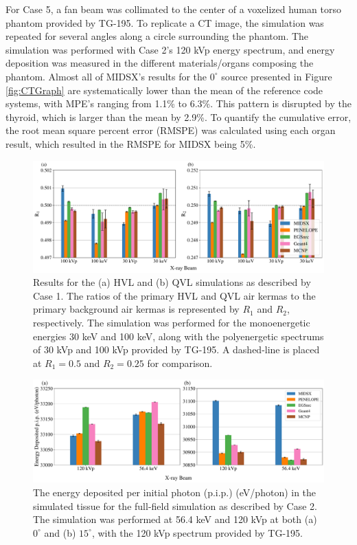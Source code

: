 \par For Case 5, a fan beam was collimated to the center of a voxelized human torso phantom provided by TG-195. To replicate a CT image, the simulation was repeated for several angles along a circle surrounding the phantom. The simulation was performed with Case 2's 120 kVp energy spectrum, and energy deposition was measured in the different materials/organs composing the phantom. Almost all of MIDSX's results for the $0^\circ$ source presented in Figure \ref{fig:CTGraph} are systematically lower than the mean of the reference code systems, with MPE's ranging from 1.1\% to 6.3\%. This pattern is disrupted by the thyroid, which is larger than the mean by 2.9\%. To quantify the cumulative error, the root mean square percent error (RMSPE) was calculated using each organ result, which resulted in the RMSPE for MIDSX being 5\%.   


\begin{figure}[htbp!]
    \centering
	\includegraphics[width=1.0\textwidth]{../figures/HVL_and_QVL_paper_ready.pdf}
	\caption{Results for the (a) HVL and (b) QVL simulations as described by Case 1. The ratios of the primary HVL and QVL air kermas to the primary background air kermas is represented by $R_1$ and $R_2$, respectively. The simulation was performed for the monoenergetic energies 30 keV and 100 keV, along with the polyenergetic spectrums of 30 kVp and 100 kVp provided by TG-195. A dashed-line is placed at $R_1 = 0.5$ and $R_2 = 0.25$ for comparison.}
	\label{fig:HVLGraph}
\end{figure}

\begin{figure}[H]
    \centering
	\includegraphics[width=1.0\textwidth]{../figures/radiography_body_dep_paper_ready.pdf}
	\caption{The energy deposited per initial photon (p.i.p.) (eV/photon) in the simulated tissue for the full-field simulation as described by Case 2. The simulation was performed at 56.4 keV and 120 kVp at both (a) $0^\circ$ and (b) $15^\circ$, with the 120 kVp spectrum provided by TG-195.}
 	\label{fig:BDGraph}
\end{figure}


